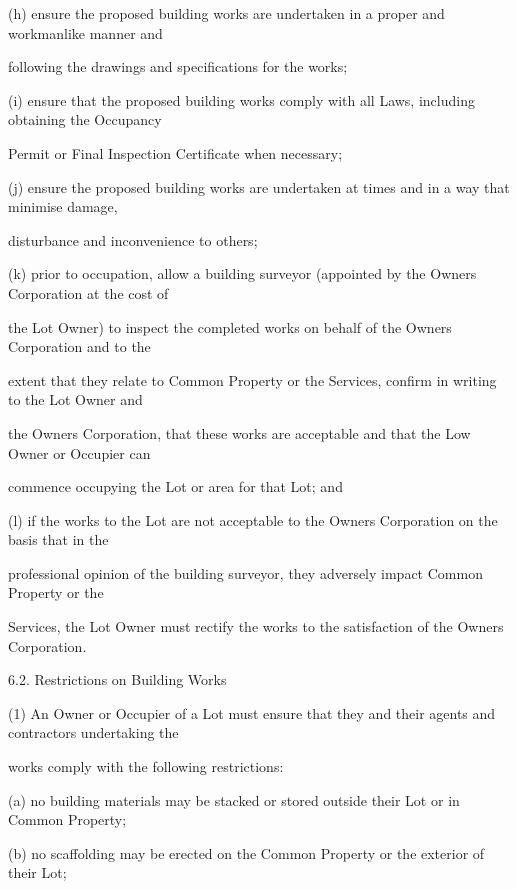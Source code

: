 \documentclass{article}
\begin{document}
{\fontsize{9.962}{1}(h) ensure the proposed building works are undertaken in a proper and workmanlike manner and }

{\fontsize{10.02}{1}following the drawings and specifications for the works; }

{\fontsize{9.962}{1}(i) ensure that the proposed building works comply with all Laws, including obtaining the Occupancy }

{\fontsize{10.02}{1}Permit or Final Inspection Certificate when necessary; }

{\fontsize{9.962}{1}(j) ensure the proposed building works are undertaken at times and in a way that minimise damage, }

{\fontsize{10.02}{1}disturbance and inconvenience to others; }

{\fontsize{9.962}{1}(k) prior to occupation, allow a building surveyor (appointed by the Owners Corporation at the cost of }

{\fontsize{10.02}{1}the Lot Owner) to inspect the completed works on behalf of the Owners Corporation and to the }

{\fontsize{10.02}{1}extent that they relate to Common Property or the Services, confirm in writing to the Lot Owner and }

{\fontsize{10.02}{1}the Owners Corporation, that these works are acceptable and that the Low Owner or Occupier can }

{\fontsize{10.02}{1}commence occupying the Lot or area for that Lot; and }

{\fontsize{9.962}{1}(l) if the works to the Lot are not acceptable to the Owners Corporation on the basis that in the }

{\fontsize{10.02}{1}professional opinion of the building surveyor, they adversely impact Common Property or the }

{\fontsize{10.02}{1}Services, the Lot Owner must rectify the works to the satisfaction of the Owners Corporation. }

{\fontsize{9.99}{1}6.2. Restrictions on Building Works }

{\fontsize{9.962}{1}(1) An Owner or Occupier of a Lot must ensure that they and their agents and contractors undertaking the }

{\fontsize{10.02}{1}works comply with the following restrictions: }

{\fontsize{9.962}{1}(a) no building materials may be stacked or stored outside their Lot or in Common Property; }

{\fontsize{9.962}{1}(b) no scaffolding may be erected on the Common Property or the exterior of their Lot; }
\end{document}

